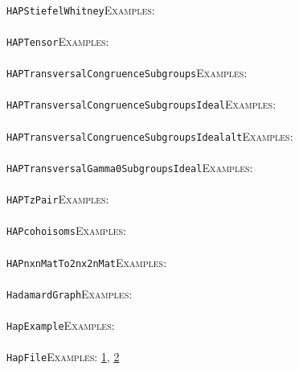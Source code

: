\documentclass[a4paper,11pt]{report}
\begin{document}
{{ \\
 \texttt{HAP{\textunderscore}StiefelWhitney}{\nobreakspace}{\nobreakspace}{\nobreakspace}{\nobreakspace}\textsc{Examples:} \\
 \\
 \texttt{HAP{\textunderscore}Tensor}{\nobreakspace}{\nobreakspace}{\nobreakspace}{\nobreakspace}\textsc{Examples:} \\
 \\
 \texttt{HAP{\textunderscore}TransversalCongruenceSubgroups}{\nobreakspace}{\nobreakspace}{\nobreakspace}{\nobreakspace}\textsc{Examples:} \\
 \\
 \texttt{HAP{\textunderscore}TransversalCongruenceSubgroupsIdeal}{\nobreakspace}{\nobreakspace}{\nobreakspace}{\nobreakspace}\textsc{Examples:} \\
 \\
 \texttt{HAP{\textunderscore}TransversalCongruenceSubgroupsIdeal{\textunderscore}alt}{\nobreakspace}{\nobreakspace}{\nobreakspace}{\nobreakspace}\textsc{Examples:} \\
 \\
 \texttt{HAP{\textunderscore}TransversalGamma0SubgroupsIdeal}{\nobreakspace}{\nobreakspace}{\nobreakspace}{\nobreakspace}\textsc{Examples:} \\
 \\
 \texttt{HAP{\textunderscore}TzPair}{\nobreakspace}{\nobreakspace}{\nobreakspace}{\nobreakspace}\textsc{Examples:} \\
 \\
 \texttt{HAP{\textunderscore}coho{\textunderscore}isoms}{\nobreakspace}{\nobreakspace}{\nobreakspace}{\nobreakspace}\textsc{Examples:} \\
 \\
 \texttt{HAP{\textunderscore}nxnMatTo2nx2nMat}{\nobreakspace}{\nobreakspace}{\nobreakspace}{\nobreakspace}\textsc{Examples:} \\
 \\
 \texttt{HadamardGraph}{\nobreakspace}{\nobreakspace}{\nobreakspace}{\nobreakspace}\textsc{Examples:} \\
 \\
 \texttt{HapExample}{\nobreakspace}{\nobreakspace}{\nobreakspace}{\nobreakspace}\textsc{Examples:} \\
 \\
 \texttt{HapFile}{\nobreakspace}{\nobreakspace}{\nobreakspace}{\nobreakspace}\textsc{Examples:} \href{tutorial/chap2.html} {1}{\nobreakspace}, \href{tutorial/chap4.html} {2}{\nobreakspace} \\
}}
\end{document}
